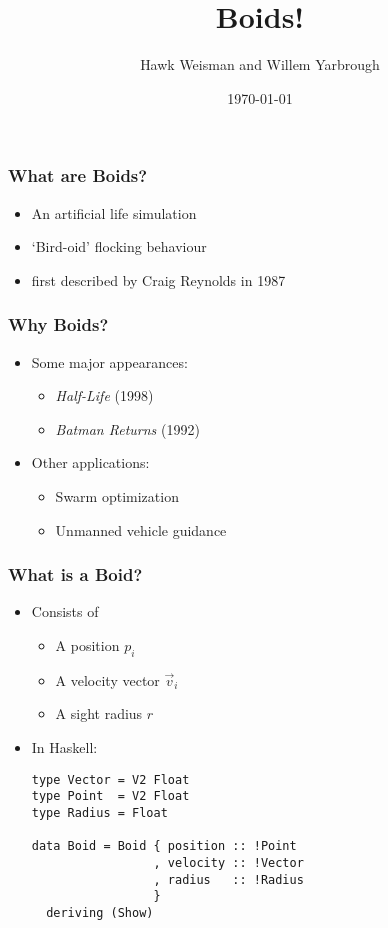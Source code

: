 \documentclass{beamer}
\title{Boids!}
\author[Weisman and Yarbrough]{Hawk Weisman and Willem Yarbrough}
\institute[Allegheny College]{Department of Computer Science \\ Allegheny College}
\date{\today}
\begin{document}
\begin{frame}
  \titlepage
\end{frame}

\begin{frame}
    \frametitle{\huge{What are Boids?}\normalsize}
    \begin{itemize}
        \item An artificial life simulation
        \item `Bird-oid' flocking behaviour
        \item first described by Craig Reynolds in 1987~\cite{reynolds1987flocks}
    \end{itemize}
\end{frame}

\begin{frame}
    \frametitle{\huge{Why Boids?}\normalsize}
    \begin{itemize}
        \item Some major appearances:
        \begin{itemize}
            \item \textit{Half-Life} (1998)
            \item \textit{Batman Returns} (1992)
        \end{itemize}
        \item Other applications:
        \begin{itemize}
            \item Swarm optimization
            \item Unmanned vehicle guidance
        \end{itemize}
    \end{itemize}
\end{frame}

\begin{frame}[fragile]
    \frametitle{\huge{What is a Boid?}\normalsize}
    \begin{itemize}
        \item Consists of
        \begin{itemize}
            \item A position $p_i$
            \item A velocity vector $\vec{v}_i$
            \item A sight radius $r$
        \end{itemize}
        \item In Haskell:
        \begin{verbatim}
type Vector = V2 Float
type Point  = V2 Float
type Radius = Float

data Boid = Boid { position :: !Point
                 , velocity :: !Vector
                 , radius   :: !Radius
                 }
  deriving (Show)
        \end{verbatim}
    \end{itemize}
\end{frame}
\end{document}
